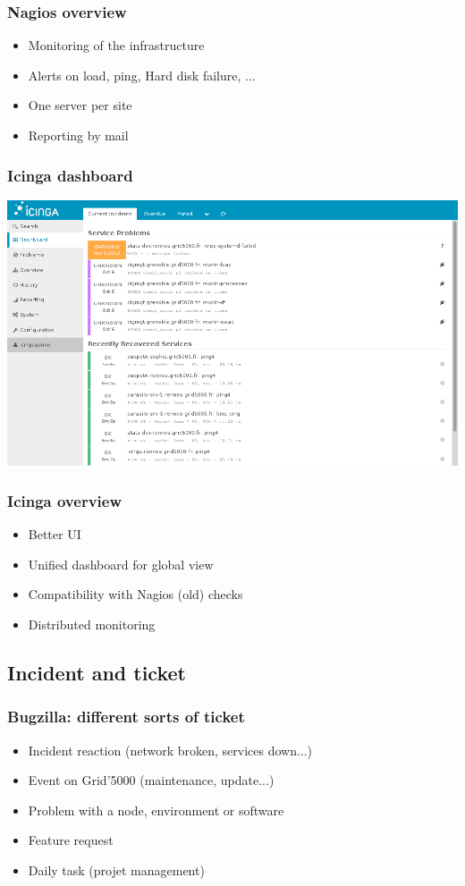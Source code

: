 \documentclass[11pt,compress]{beamer}
\begin{document}
\begin{frame}
\frametitle{Nagios overview}
\begin{itemize}
\item Monitoring of the infrastructure
\item Alerts on load, ping, Hard disk failure, ...
\item One server per site
\item Reporting by mail 
\end{itemize}
\end{frame}

\begin{frame}
\frametitle{Icinga dashboard}
\begin{center}
\includegraphics[scale=0.30]{figures/icinga}
\end{center}
\end{frame}

\begin{frame}
\frametitle{Icinga overview}
\begin{itemize}
\item Better UI
\item Unified dashboard for global view
\item Compatibility with Nagios (old) checks
\item Distributed monitoring
\end{itemize}
\end{frame}

\subsection{Incident and ticket}
\begin{frame}
\frametitle{Bugzilla: different sorts of ticket}
\begin{itemize}
\item Incident reaction (network broken, services down...)
\item Event on Grid'5000 (maintenance, update...)
\item Problem with a node, environment or software
\item Feature request
\item Daily task (projet management)
\end{itemize}
\end{frame}
\end{document}
